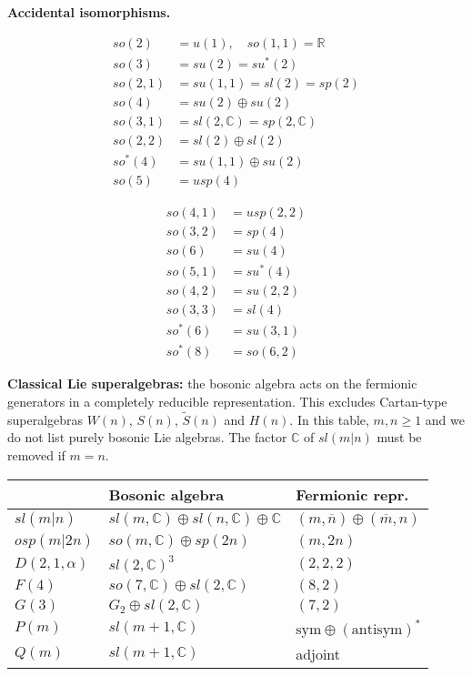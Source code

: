 \documentclass[10pt,letterpaper]{article}
\def\myparagraph #1{\textbf{#1}}
\begin{document}
\myparagraph{Accidental isomorphisms.}
\begin{center}
\vspace{-1.5\baselineskip}
\begin{minipage}[t]{.55\linewidth}
\begin{align*}
so(2)&= u(1), \quad so(1,1)=\mathbb{R}\\
so(3)&= su(2)=su^*(2)\\
so(2,1) &=su(1,1)=sl(2)=sp(2)\\
so(4)&=su(2)\oplus su(2)\\
so(3,1)&=sl(2,\mathbb{C})=sp(2,\mathbb{C})\\
so(2,2)&=sl(2)\oplus sl(2)\\
so^*(4)&=su(1,1)\oplus su(2)\\
so(5)&=usp(4)
\end{align*}
\end{minipage}%
\begin{minipage}[t]{.45\linewidth}
\begin{align*}
so(4,1)&=usp(2,2)\\
so(3,2)&=sp(4)\\
so(6)&=su(4)\\
so(5,1)&=su^*(4)\\
so(4,2)&=su(2,2)\\
so(3,3)&=sl(4)\\
so^*(6)&=su(3,1)\\
so^*(8)&=so(6,2)
\end{align*}
\end{minipage}
\end{center}

\myparagraph{Classical Lie superalgebras:}
the bosonic algebra acts on the fermionic generators in a completely reducible representation.
This excludes Cartan-type superalgebras $W(n)$, $S(n)$, $\tilde S(n)$ and $H(n)$.
In this table, $m,n\geq 1$ and we do not list purely bosonic Lie algebras.
The factor $\mathbb{C}$ of $sl(m|n)$ must be removed if $m=n$.
\begin{center}
\vspace{-.5\baselineskip}
\begin{tabular}{lll}\toprule
& Bosonic algebra & Fermionic repr. \\\midrule
$sl(m|n)$ & $sl(m,\mathbb{C})\oplus sl(n,\mathbb{C})\oplus\mathbb{C}$ & $(m,\overline{n})\oplus(\overline{m},n)$ \\
$osp(m|2n)$ & $so(m,\mathbb{C}) \oplus sp(2n)$ & $(m,2n)$ \\
$D(2,1,\alpha)$ & $sl(2,\mathbb{C})^3$ & $(2,2,2)$ \\
$F(4)$ & $so(7,\mathbb{C})\oplus sl(2,\mathbb{C})$ & $(8,2)$ \\
$G(3)$ & $G_2\oplus sl(2,\mathbb{C})$ & $(7,2)$ \\
$P(m)$ & $sl(m+1,\mathbb{C})$ & $\text{sym}\oplus(\text{antisym})^*$ \\
$Q(m)$ & $sl(m+1,\mathbb{C})$ & adjoint\\
\bottomrule
\end{tabular}
\end{center}
\end{document}
